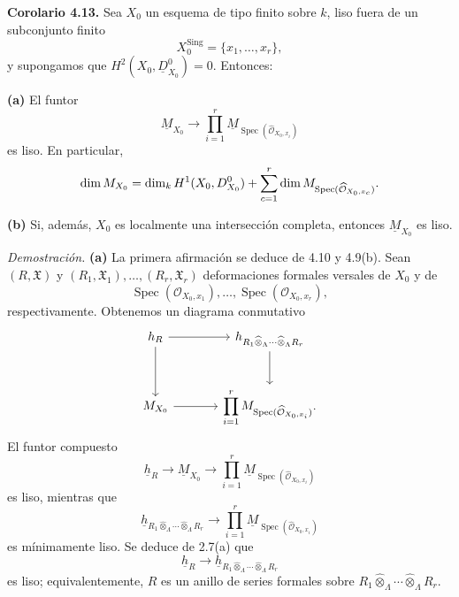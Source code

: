 \par\medskip
\noindent\textbf{Corolario 4.13.}
Sea $X_0$ un esquema de tipo finito sobre $k$, liso fuera de un
subconjunto finito
\[
X_0^{\mathrm{Sing}}=\{x_1,\ldots,x_r\},
\]
y supongamos que $H^2(X_0,\underline D^0_{X_0})=0$. Entonces:

\smallskip
\noindent\textbf{(a)} El funtor
\[
\underline M_{X_0}\longrightarrow
\prod_{i=1}^r
\underline M_{\operatorname{Spec}(\widehat{\mathcal O}_{X_0,x_i})}
\]
es liso. En particular,
\[
\dim\underline M_{X_0}
=\dim_k H^1(X_0,\underline D^0_{X_0})
+\sisi{\sum_{i=1}^r
\dim\underline M_{\operatorname{Spec}(\widehat{\mathcal O}_{X_0,x_i})}}{\sum_{c=1}^r
\dim\underline M_{\operatorname{Spec}(\widehat{\mathcal O}_{X_0,x_c})}}.
\]

\smallskip
\noindent\textbf{(b)} Si, además, $X_0$ es localmente una
intersección completa, entonces $\underline M_{X_0}$ es liso.


\smallskip
\noindent\textit{Demostración.}
\textbf{(a)} La primera afirmación se deduce de 4.10 y 4.9(b).
Sean $(R,\mathfrak X)$ y
$(R_1,\mathfrak X_1),\ldots,(R_r,\mathfrak X_r)$ deformaciones
formales versales de $X_0$ y de
\[
\operatorname{Spec}(\mathcal O_{X_0,x_1}),\ldots,
\operatorname{Spec}(\mathcal O_{X_0,x_r}),
\]
respectivamente. Obtenemos un diagrama conmutativo
\[
\begin{tikzcd}[column sep=large,row sep=large]
\underline h_R
  \arrow[r]
  \arrow[d]
& \underline h_{R_1\widehat\otimes_\Lambda\cdots
  \widehat\otimes_\Lambda R_r}
  \arrow[d] \\
\underline M_{X_0}
  \arrow[r]
& \displaystyle\prod_{i=1}^r
  \underline M_{\operatorname{Spec}(\widehat{\mathcal O}_{X_0,x_i})}.
\end{tikzcd}
\]
El funtor compuesto
\[
\underline h_R\longrightarrow\underline M_{X_0}
\longrightarrow
\prod_{i=1}^r
\underline M_{\operatorname{Spec}(\widehat{\mathcal O}_{X_0,x_i})}
\]
es liso, mientras que
\[
\underline h_{R_1\widehat\otimes_\Lambda\cdots
\widehat\otimes_\Lambda R_r}
\longrightarrow
\prod_{i=1}^r
\underline M_{\operatorname{Spec}(\widehat{\mathcal O}_{X_0,x_i})}
\]
es mínimamente liso. Se deduce de 2.7(a) que
\[
\underline h_R\longrightarrow
\underline h_{R_1\widehat\otimes_\Lambda\cdots
\widehat\otimes_\Lambda R_r}
\]
es liso; equivalentemente, $R$ es un anillo de series formales sobre
$R_1\widehat\otimes_\Lambda\cdots\widehat\otimes_\Lambda R_r$.

